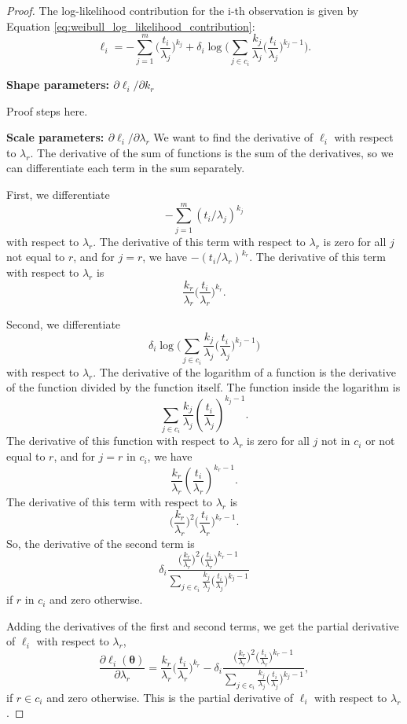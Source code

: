 \documentclass[
]{article}
\begin{document}
\begin{proof}
The log-likelihood contribution for the i-th observation is given by Equation \eqref{eq:weibull_log_likelihood_contribution}:
$$
\ell_i = -\sum_{j=1}^m \biggl(\frac{t_i}{\lambda_j}\biggr)^{k_j} +
    \delta_i \log \Biggl(\sum_{j \in c_i} \frac{k_j}{\lambda_j} \biggl(\frac{t_i}{\lambda_j}\biggr)^{k_j - 1} \Biggr).
$$

\textbf{Shape parameters: $\partial \ell_i / \partial k_r$}

Proof steps here.

\textbf{Scale parameters: $\partial \ell_i / \partial \lambda_r$}
We want to find the derivative of $\ell_i$ with respect to $\lambda_r$. 
The derivative of the sum of functions is the sum of the derivatives, so we can
differentiate each term in the sum separately. 

First, we differentiate
$$
    -\sum_{j=1}^m (t_i/\lambda_j)^{k_j}
$$
with respect to $\lambda_r$. The derivative of this term with respect to
$\lambda_r$ is zero for all $j$ not equal to $r$, and for $j = r$, we have
$-(t_i/\lambda_r)^{k_r}$. The derivative of this term with respect to $\lambda_r$ is
$$
\frac{k_r}{\lambda_r} \biggl(\frac{t_i}{\lambda_r}\biggr)^{k_r}.
$$

Second, we differentiate
$$
\delta_i \log\Biggl(\sum_{j \in c_i} \frac{k_j}{\lambda_j} \biggl(\frac{t_i}{\lambda_j}\biggr)^{k_j - 1}\Biggr)
$$
with respect to $\lambda_r$.
The derivative of the logarithm of a function is the derivative of the function
divided by the function itself.
The function inside the logarithm is
$$
\sum_{j \in c_i} \frac{k_j}{\lambda_j} \left(\frac{t_i}{\lambda_j}\right)^{k_j - 1}. 
$$
The derivative of this function with respect to $\lambda_r$ is zero for all $j$ not
in $c_i$ or not equal to $r$, and for $j = r$ in $c_i$, we have
$$
\frac{k_r}{\lambda_r} \left(\frac{t_i}{\lambda_r}\right)^{k_r - 1}. 
$$
The derivative of this term with respect to $\lambda_r$ is
$$
\biggl(\frac{k_r}{\lambda_r}\biggr)^2 \biggl(\frac{t_i}{\lambda_r}\biggr)^{k_r - 1}.
$$
So, the derivative of the second term is
$$
\delta_i \frac{\bigl(\frac{k_r}{\lambda_r}\bigr)^2 \bigl(\frac{t_i}{\lambda_r}\bigr)^{k_r - 1} }
{\sum_{j \in c_i} \frac{k_j}{\lambda_j}\bigl(\frac{t_i}{\lambda_j}\bigr)^{k_j-1}}
$$
if $r$ in $c_i$ and zero otherwise.

Adding the derivatives of the first and second terms, we get the partial derivative
of $\ell_i$ with respect to $\lambda_r$,
$$
\frac{\partial \ell_i(\boldsymbol{\theta})}{\partial \lambda_r} = 
    \frac{k_r}{\lambda_r} \biggl(\frac{t_i}{\lambda_r}\biggr)^{k_r} -
    \delta_i \frac{
        \bigl(\frac{k_r}{\lambda_r}\bigr)^2 \bigl(\frac{t_i}{\lambda_r}\bigr)^{k_r - 1}
    }
    {
        \sum_{j \in c_i} \frac{k_j}{\lambda_j}\bigl(\frac{t_i}{\lambda_j}\bigr)^{k_j-1}
    },
$$
if $r \in c_i$ and zero otherwise.
This is the partial derivative of $\ell_i$ with respect to $\lambda_r$.
\end{proof}
\end{document}
